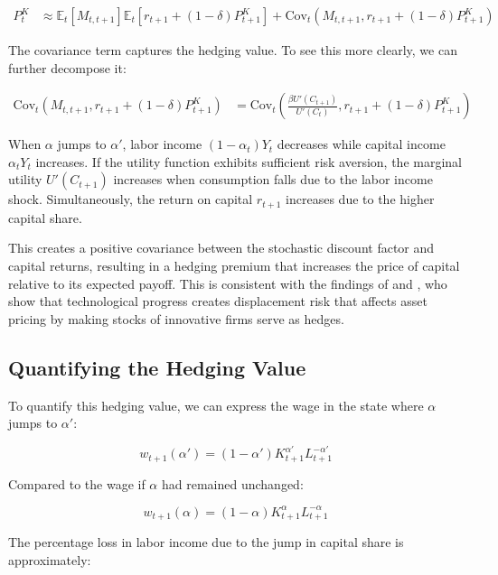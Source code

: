 \documentclass{article}
\theoremstyle{plain}    %
\theoremstyle{definition}  %
\begin{document}
\begin{align}
P_t^K &\approx \mathbb{E}_t[M_{t,t+1}]\mathbb{E}_t[r_{t+1} + (1-\delta)P_{t+1}^K] + \text{Cov}_t(M_{t,t+1}, r_{t+1} + (1-\delta)P_{t+1}^K)
\end{align}

The covariance term captures the hedging value. To see this more clearly, we can further decompose it:

\begin{align}
\text{Cov}_t(M_{t,t+1}, r_{t+1} + (1-\delta)P_{t+1}^K) &= \text{Cov}_t\left(\frac{\beta U'(C_{t+1})}{U'(C_t)}, r_{t+1} + (1-\delta)P_{t+1}^K\right)
\end{align}

When $\alpha$ jumps to $\alpha'$, labor income $(1-\alpha_t)Y_t$ decreases while capital income $\alpha_t Y_t$ increases. If the utility function exhibits sufficient risk aversion, the marginal utility $U'(C_{t+1})$ increases when consumption falls due to the labor income shock. Simultaneously, the return on capital $r_{t+1}$ increases due to the higher capital share.

This creates a positive covariance between the stochastic discount factor and capital returns, resulting in a hedging premium that increases the price of capital relative to its expected payoff. This is consistent with the findings of \citet{garleanu2012} and \citet{kogan2020}, who show that technological progress creates displacement risk that affects asset pricing by making stocks of innovative firms serve as hedges.

\subsection{Quantifying the Hedging Value}

To quantify this hedging value, we can express the wage in the state where $\alpha$ jumps to $\alpha'$:

\begin{equation}
w_{t+1}(\alpha') = (1-\alpha')K_{t+1}^{\alpha'}L_{t+1}^{-\alpha'}
\end{equation}

Compared to the wage if $\alpha$ had remained unchanged:

\begin{equation}
w_{t+1}(\alpha) = (1-\alpha)K_{t+1}^{\alpha}L_{t+1}^{-\alpha}
\end{equation}

The percentage loss in labor income due to the jump in capital share is approximately:
\end{document}
